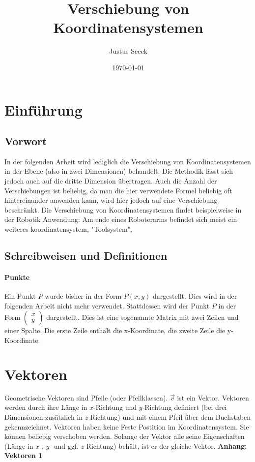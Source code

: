 \documentclass{article}
\title{Verschiebung von Koordinatensystemen}
\author{Justus Seeck}
\date{\today}
\newcommand{\m}[1]{\begin{pmatrix}#1\end{pmatrix}}
\begin{document}
    \maketitle

    \tableofcontents

    \newpage

    \section{Einführung}

    \subsection{Vorwort}

    In der folgenden Arbeit wird lediglich die Verschiebung von Koordinatensystemen in der Ebene (also in zwei Dimensionen) behandelt.
    Die Methodik lässt sich jedoch auch auf die dritte Dimension übertragen. Auch die Anzahl der Verschiebungen ist beliebig, da man die
    hier verwendete Formel beliebig oft hintereinander anwenden kann, wird hier jedoch auf eine Verschiebung beschränkt.
    Die Verschiebung von Koordinatensystemen findet beispielweise in der Robotik Anwendung: Am ende eines Roboterarms befindet sich meist ein weiteres koordinatensystem, "Toolsystem",

    \subsection{Schreibweisen und Definitionen}
    
    \paragraph*{Punkte}

    Ein Punkt $P$ wurde bisher in der Form $P(x,y)$ dargestellt. Dies wird in der folgenden Arbeit nicht mehr verwendet. Stattdessen wird
    der Punkt $P$ in der Form $\m{x \\ y}$ dargestellt. Dies ist eine sogenannte Matrix mit zwei Zeilen und einer Spalte.
    Die erste Zeile enthält die x-Koordinate, die zweite Zeile die y-Koordinate.

    
    \section{Vektoren}

    Geometrische Vektoren sind Pfeile (oder Pfeilklassen). $\vec{v}$ ist ein Vektor.
    Vektoren werden durch ihre Länge in $x$-Richtung und $y$-Richtung definiert
    (bei drei Dimensionen zusätzlich in $z$-Richtung) und mit einem Pfeil über dem Buchstaben gekennzeichnet.
    Vektoren haben keine Feste Postition im Koordinatensystem. Sie können beliebig verschoben werden.
    Solange der Vektor alle seine Eigenschaften (Länge in $x$-, $y$- und ggf. $z$-Richtung) behält,
    ist er der gleiche Vektor. \textbf{Anhang: Vektoren 1}
\end{document}

